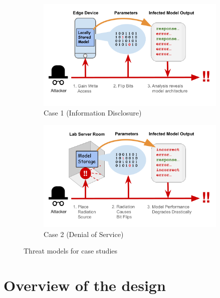 \begin{figure}[!htbp]
    \centering
    \begin{subfigure}[b]{\linewidth}
        \centering
        \includegraphics[width=1.0\linewidth]{images/threat-case-1.png}
        \caption{Case 1 (Information Disclosure)}
    \end{subfigure}
    \vspace{1cm}
    \begin{subfigure}[b]{\linewidth}
        \centering
        \includegraphics[width=1.0\linewidth]{images/threat-case-2.png}
        \caption{Case 2 (Denial of Service)}
    \end{subfigure}
    \caption{Threat models for case studies}
    \label{fig:threatcases}
\end{figure}

\section{Overview of the design}
\label{sec:overview}

